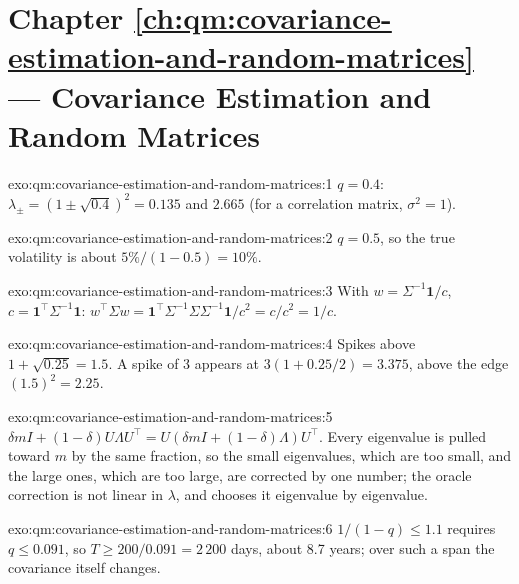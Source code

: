 \section*{Chapter \ref{ch:qm:covariance-estimation-and-random-matrices} --- Covariance Estimation and Random Matrices}

\begin{solution}{exo:qm:covariance-estimation-and-random-matrices:1}
$q = 0.4$: $\lambda_\pm = (1 \pm \sqrt{0.4})^2 = 0.135$ and $2.665$ (for a correlation matrix, $\sigma^2 = 1$).
\end{solution}

\begin{solution}{exo:qm:covariance-estimation-and-random-matrices:2}
$q = 0.5$, so the true volatility is about $5\%/(1 - 0.5) = 10\%$.
\end{solution}

\begin{solution}{exo:qm:covariance-estimation-and-random-matrices:3}
With $w = \Sigma^{-1}\mathbf 1/c$, $c = \mathbf 1^\top\Sigma^{-1}\mathbf 1$: $w^\top\Sigma w = \mathbf 1^\top\Sigma^{-1}\Sigma\Sigma^{-1}\mathbf 1/c^2 = c/c^2 = 1/c$.
\end{solution}

\begin{solution}{exo:qm:covariance-estimation-and-random-matrices:4}
Spikes above $1 + \sqrt{0.25} = 1.5$. A spike of 3 appears at $3(1 + 0.25/2) = 3.375$, above the edge $(1.5)^2 = 2.25$.
\end{solution}

\begin{solution}{exo:qm:covariance-estimation-and-random-matrices:5}
$\delta mI + (1 - \delta)U\Lambda U^\top = U(\delta mI + (1 - \delta)\Lambda)U^\top$. Every eigenvalue is pulled toward $m$ by the same fraction, so the small eigenvalues, which are too small,
and the large ones, which are too large, are corrected by one number; the oracle correction is not linear in $\lambda$, and  chooses it eigenvalue by eigenvalue.
\end{solution}

\begin{solution}{exo:qm:covariance-estimation-and-random-matrices:6}
$1/(1 - q) \le 1.1$ requires $q \le 0.091$, so $T \ge 200/0.091 = 2\,200$ days, about 8.7 years; over such a span the covariance itself changes.
\end{solution}

